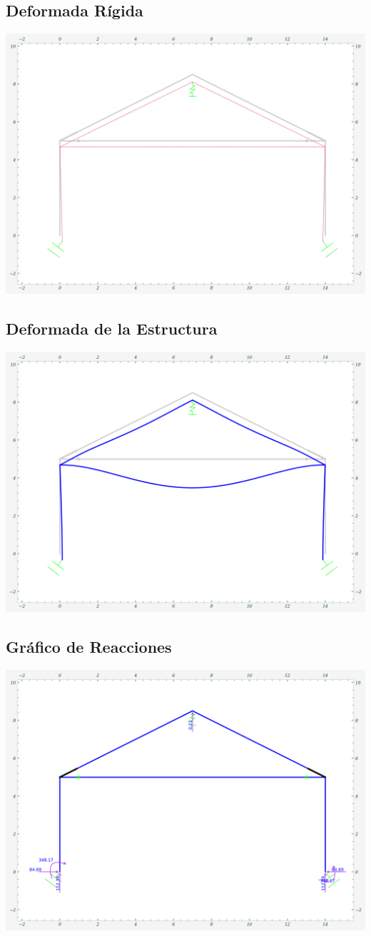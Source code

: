 \subsection{Deformada Rígida}
\includegraphics[width=1\textwidth]{img/deforma_rigida.png}

\subsection{Deformada de la Estructura}
\includegraphics[width=1\textwidth]{img/deformada.png}

\subsection{Gráfico de Reacciones}
\includegraphics[width=1\textwidth]{img/reacciones.png}

